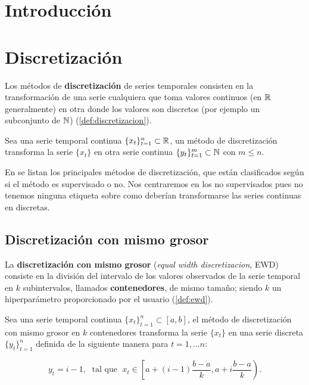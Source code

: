 
\chapter{Introducción}\label{ch:sd-introduccion}


\chapter{Discretización}\label{ch:discretizacion}

Los métodos de \textbf{discretización} de series temporales consisten en la transformación de una serie cualquiera que toma valores continuos (en $\mathbb{R}$ generalmente) en otra donde los valores son discretos (por ejemplo un subconjunto de $\mathbb{N}$) (\autoref{def:discretizacion}).

\begin{definicion}[Discretización]
  Sea una serie temporal continua $\{x_t\}_{t = 1}^n \subset \mathbb{R}$, un método de discretización transforma la serie $\{x_t\}$ en otra serie continua $\{y_t\}_{t = 1}^m \subset \mathbb{N}$ con $m \leq n$.
  \label{def:discretizacion}
\end{definicion}

En \cite{chaudhari2014discretization} se listan los principales métodos de discretización, que están clasificados según si el método es supervisado o no. Nos centraremos en los no supervisados pues no tenemos ninguna etiqueta sobre como deberían transformarse las series continuas en discretas.

\section{Discretización con mismo grosor}

La \textbf{discretización con mismo grosor} (\emph{equal width discretizacion}, EWD) consiste en la división del intervalo de los valores observados de la serie temporal en $k$ subintervalos, llamados \textbf{contenedores}, de mismo tamaño; siendo $k$ un hiperparámetro proporcionado por el usuario (\autoref{def:ewd}).

\begin{definicion}
  Sea una serie temporal continua $\{x_t\}_{t = 1}^n \subset [a, b]$, el método de discretización con mismo grosor en $k$ contenedores transforma la serie $\{x_t\}$ en una serie discreta $\{y_t\}_{t = 1}^n$ definida de la siguiente manera para $t = 1, \ldots n$:

  $$y_t = i-1, \; \text{ tal que } \; x_t \in \left[a + (i-1) \dfrac{b - a}{k}, a + i \dfrac{b-a}{k}\right).$$
  \label{def:ewd}
\end{definicion}

